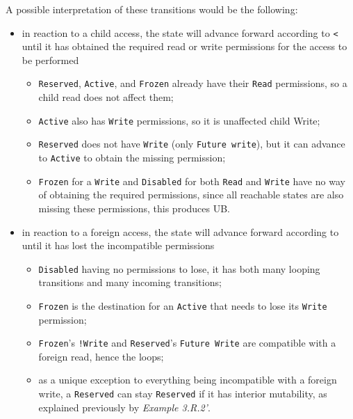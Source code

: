 \documentclass[a4paper,11pt]{article}
\theoremstyle{plain}
\theoremstyle{definition}
\theoremstyle{remark}
\newcommand{\tcode}[1]{\rstinline{#1}}
\newcommand{\tperm}[1]{\texttt{#1}}
\begin{document}
A possible interpretation of these transitions would be the following:
\begin{itemize}
    \item in reaction to a child access, the state will advance forward according to \tperm{<} until
        it has obtained the required read or write permissions for the access to be performed
        \begin{itemize}
            \item \tperm{Reserved}, \tperm{Active}, and \tperm{Frozen} already have their \tperm{Read} permissions,
                so a child read does not affect them;
            \item \tperm{Active} also has \tperm{Write} permissions, so it is unaffected child Write;
            \item \tperm{Reserved} does not have \tperm{Write} (only \tperm{Future write}), but it can advance to \tperm{Active} to
                obtain the missing permission;
            \item \tperm{Frozen} for a \tperm{Write} and \tperm{Disabled} for both \tperm{Read} and \tperm{Write} have no way of
                obtaining the required permissions, since all reachable states are also missing these
                permissions, this produces UB.
        \end{itemize}
    \item in reaction to a foreign access, the state will advance forward according to \tcode{<} until
        it has lost the incompatible permissions
        \begin{itemize}
            \item \tperm{Disabled} having no permissions to lose, it has both many looping transitions and many incoming transitions;
            \item \tperm{Frozen} is the destination for an \tperm{Active} that needs to lose its \tperm{Write} permission;
            \item \tperm{Frozen}'s \tperm{!Write} and \tperm{Reserved}'s \tperm{Future Write} are compatible with a foreign read, hence the loops;
            \item as a unique exception to everything being incompatible with a foreign write, a \tperm{Reserved} can stay
                \tperm{Reserved} if it has interior mutability, as explained previously by \textit{Example 3.R.2'}.
        \end{itemize}
\end{itemize}
\end{document}
